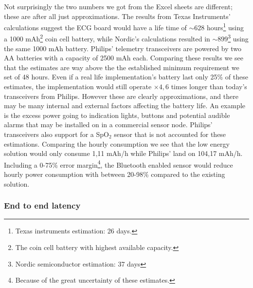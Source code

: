 Not surprisingly the two numbers we got from the Excel sheets are different; these are after all just approximations. The results from Texas Instruments' calculations suggest the ECG board would have a life time of $\sim628$ hours\footnote{ Texas instruments estimation: 26 days.} using a 1000 mAh\footnote{ The coin cell battery with highest available capacity.} coin cell battery, while Nordic's calculations resulted in $\sim899$\footnote{ Nordic semiconductor estimation: 37 days} using the same 1000 mAh battery. Philips' telemetry transceivers are powered by two AA batteries with a capacity of 2500 mAh each. Comparing these results we see that the estimates are way above the the established minimum requirement we set of 48 hours. Even if a real life implementation's battery last only 25\% of these estimates, the implementation would still operate $\times 4,6$ times longer than today's transceivers from Philips. However these are clearly approximations, and there may be many internal and external factors affecting the battery life. An example is the excess power going to indication lights, buttons and potential audible alarms that may be installed on in a commercial sensor node. Philips' transceivers also support for a SpO$_2$ sensor that is not accounted for these estimations. Comparing the hourly consumption we see that the low energy solution would only consume 1,11 mAh/h while Philips' land on 104,17 mAh/h. Including a 0-75\% error margin\footnote{ Because of the great uncertainty of these estimates.}, the Bluetooth enabled sensor would reduce hourly power consumption with between 20-98\% compared to the existing solution.


\subsubsection{End to end latency} %
\label{ssub:end_to_end_latency}

